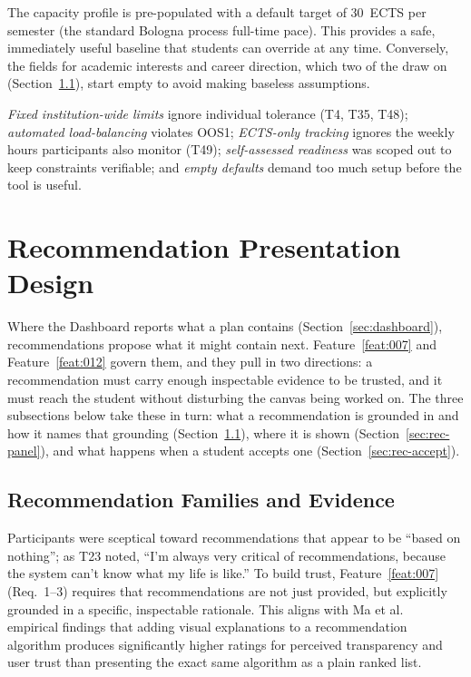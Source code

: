 The capacity profile is pre-populated with a default target of 30~ECTS per semester (the standard Bologna process full-time pace). This provides a safe, immediately useful baseline that students can override at any time. Conversely, the fields for academic interests and career direction, which two of the  draw on (Section~\ref{sec:rec-types-evidence}), start empty to avoid making baseless assumptions.

\emph{Fixed institution-wide limits} ignore individual tolerance (T4, T35, T48); \emph{automated load-balancing} violates OOS1; \emph{ECTS-only tracking} ignores the weekly hours participants also monitor (T49); \emph{self-assessed readiness} was scoped out to keep constraints verifiable; and \emph{empty defaults} demand too much setup before the tool is useful.

\section{Recommendation Presentation Design}
\label{sec:recommendations}

Where the Dashboard reports what a plan contains (Section~\ref{sec:dashboard}), recommendations propose what it might contain next. Feature~\ref{feat:007} and Feature~\ref{feat:012} govern them, and they pull in two directions: a recommendation must carry enough inspectable evidence to be trusted, and it must reach the student without disturbing the canvas being worked on. The three subsections below take these in turn: what a recommendation is grounded in and how it names that grounding (Section~\ref{sec:rec-types-evidence}), where it is shown (Section~\ref{sec:rec-panel}), and what happens when a student accepts one (Section~\ref{sec:rec-accept}).




\subsection{Recommendation Families and Evidence}
\label{sec:rec-types-evidence}
Participants were sceptical toward recommendations that appear to be \enquote{based on nothing}; as T23 noted, \enquote{I'm always very critical of recommendations, because the system can't know what my life is like.} To build trust, Feature~\ref{feat:007} (Req.~1--3) requires that recommendations are not just provided, but explicitly grounded in a specific, inspectable rationale. This aligns with Ma et al.~\cite{ma_courseq_2021} empirical findings that adding visual explanations to a recommendation algorithm produces significantly higher ratings for perceived transparency and user trust than presenting the exact same algorithm as a plain ranked list.

